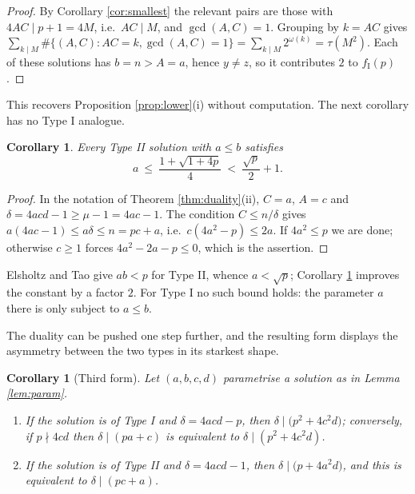 \documentclass[11pt,reqno]{amsart}
\theoremstyle{plain}
\newtheorem{corollary}[theorem]{Corollary}
\theoremstyle{definition}
\numberwithin{equation}{section}
\newcommand{\fI}{f_{\mathrm{I}}}
\begin{document}
\begin{proof}
By Corollary \ref{cor:smallest} the relevant pairs are those with $4AC\mid p+1=4M$,
i.e.\ $AC\mid M$, and $\gcd(A,C)=1$. Grouping by $k=AC$ gives
$\sum_{k\mid M}\#\{(A,C):AC=k,\gcd(A,C)=1\}=\sum_{k\mid M}2^{\omega(k)}=\tau(M^{2})$.
Each of these solutions has $b=n>A=a$, hence $y\ne z$, so it contributes $2$ to
$\fI(p)$.
\end{proof}

This recovers Proposition \ref{prop:lower}(i) without computation. The next corollary
has no Type I analogue.

\begin{corollary}\label{cor:sqrt}
Every Type II solution with $a\le b$ satisfies
\[
  a\ \le\ \frac{1+\sqrt{1+4p}}{4}\ <\ \frac{\sqrt p}{2}+1 .
\]
\end{corollary}

\begin{proof}
In the notation of Theorem \ref{thm:duality}(ii), $C=a$, $A=c$ and
$\delta=4acd-1\ge \mu-1=4ac-1$. The condition $C\le n/\delta$ gives
$a(4ac-1)\le a\delta\le n=pc+a$, i.e.\ $c(4a^{2}-p)\le2a$. If $4a^{2}\le p$ we are
done; otherwise $c\ge1$ forces $4a^{2}-2a-p\le0$, which is the assertion.
\end{proof}

Elsholtz and Tao \cite[Lemma 2.8]{ElsholtzTao} give $ab<p$ for Type II, whence
$a<\sqrt p$; Corollary \ref{cor:sqrt} improves the constant by a factor $2$. For
Type I no such bound holds: the parameter $a$ there is only subject to $a\le b$.


The duality can be pushed one step further, and the resulting form displays the
asymmetry between the two types in its starkest shape.

\begin{corollary}[Third form]\label{cor:third}
Let $(a,b,c,d)$ parametrise a solution as in Lemma \ref{lem:param}.
\begin{enumerate}
\item[(i)] If the solution is of Type I and $\delta=4acd-p$, then
$\delta\mid\bigl(p^{2}+4c^{2}d\bigr)$; conversely, if $p\nmid 4cd$ then
$\delta\mid(pa+c)$ is equivalent to $\delta\mid(p^{2}+4c^{2}d)$.
\item[(ii)] If the solution is of Type II and $\delta=4acd-1$, then
$\delta\mid\bigl(p+4a^{2}d\bigr)$, and this is equivalent to $\delta\mid(pc+a)$.
\end{enumerate}
\end{corollary}
\end{document}
